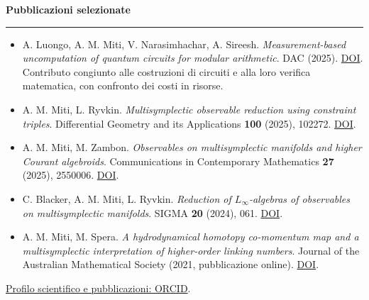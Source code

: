 \documentclass[10pt,a4paper]{article}
\newcommand{\cvsection}[1]{%
    \Needspace{4\baselineskip}%
    \vspace{0.8em}%
    {\large\bfseries\color{accent} #1}\par
    \vspace{0.2em}\hrule\vspace{0.45em}%
}
\begin{document}
\cvsection{Pubblicazioni selezionate}
\begin{itemize}[itemsep=4pt]
    \item A. Luongo, A. M. Miti, V. Narasimhachar, A. Sireesh.
    \emph{Measurement-based uncomputation of quantum circuits for modular arithmetic}.
    DAC (2025).
    \href{https://doi.org/10.1109/DAC63849.2025.11132981}{DOI}.
    Contributo congiunto alle costruzioni di circuiti e alla loro verifica matematica, con confronto dei costi in risorse.
    \item A. M. Miti, L. Ryvkin.
    \emph{Multisymplectic observable reduction using constraint triples}.
    Differential Geometry and its Applications \textbf{100} (2025), 102272.
    \href{https://doi.org/10.1016/j.difgeo.2025.102272}{DOI}.
    \item A. M. Miti, M. Zambon.
    \emph{Observables on multisymplectic manifolds and higher Courant algebroids}.
    Communications in Contemporary Mathematics \textbf{27} (2025), 2550006.
    \href{https://doi.org/10.1142/S0219199725500063}{DOI}.
    \item C. Blacker, A. M. Miti, L. Ryvkin.
    \emph{Reduction of $L_\infty$-algebras of observables on multisymplectic manifolds}.
    SIGMA \textbf{20} (2024), 061.
    \href{https://doi.org/10.3842/SIGMA.2024.061}{DOI}.
    \item A. M. Miti, M. Spera.
    \emph{A hydrodynamical homotopy co-momentum map and a multisymplectic interpretation of higher-order linking numbers}.
    Journal of the Australian Mathematical Society (2021, pubblicazione online).
    \href{https://doi.org/10.1017/S1446788720000518}{DOI}.
\end{itemize}
\href{https://orcid.org/0000-0002-8829-1943}{Profilo scientifico e pubblicazioni: ORCID}.\par
\end{document}
